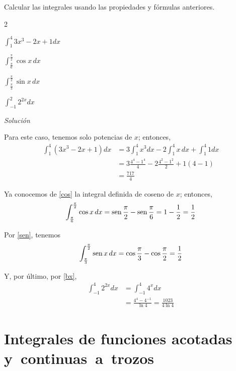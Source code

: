 \begin{ejemplo}
Calcular las integrales usando las propiedades y fórmulas anteriores.
\end{ejemplo}
\begin{multicols}{2}
\begin{parrafonumerado}
\item $\displaystyle{\int_{1}^{4}3x^{3}-2x+1 dx}$
\item $\displaystyle{\int_{\frac{\pi }{6}}^{\frac{\pi }{2}}\cos x\,dx}$
\item $\displaystyle{\int_{\frac{\pi }{3}}^{\frac{\pi }{2}}\sin x\,dx}$
\item $\displaystyle{\int_{-1}^{2}2^{2x}dx}$
\end{parrafonumerado}
\end{multicols}

\emph{Solución}
\begin{parrafonumerado}
\item Para este caso, tenemos solo potencias de $x$; entonces,
\begin{align*}
\int_{1}^{4}\left( 3x^{3}-2x+1\right) dx&=3\int_{1}^{4}x^{3}dx-2\int_{1}^{4}x\,dx+\int_{1}^{4}1dx\\
&=3\frac{4^{4}-1^{4}}{4}-2\frac{4^{2}-1^{2}}{2}+1\left( 4-1\right) \\
&=\frac{717}{4}
\end{align*}

\item Ya conocemos de \eqref{cos} la integral definida de coseno de $x$; entonces,
\begin{align*}
\int_{\frac{\pi }{6}}^{\frac{\pi }{2}}\cos x\,dx=\operatorname{sen} \frac{\pi }{2}-\operatorname{sen}
\frac{\pi }{6}=1-\frac{1}{2}=\frac{1}{2}
\end{align*}

\item Por \eqref{sen}, tenemos
\begin{align*}
\int_{\frac{\pi }{3}}^{\frac{\pi }{2}}\operatorname{sen} x\,dx=\cos \frac{\pi }{3}-\cos
\frac{\pi }{2}=\frac{1}{2}
\end{align*}

\item Y, por último, por \eqref{bx},
\begin{align*}
\int_{-1}^{4}2^{2x}dx&=\int_{-1}^{4}4^{x}dx\\
&=\frac{4^{4}-4^{-1}}{\ln 4}=\frac{1023}{4\ln 4}
\end{align*}
\end{parrafonumerado}

\section{Integrales de funciones acotadas y~continuas~a~trozos}

